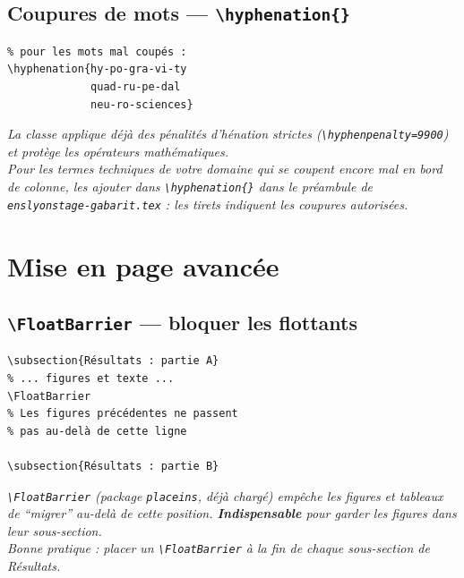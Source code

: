 \documentclass[12pt, a4paper]{article}
\begin{document}
\subsection{Coupures de mots — \texttt{\textbackslash hyphenation\{\}}}

\begin{demo}
\begin{lstlisting}[style=latexcode]
% Dans le préambule de enslyonstage-gabarit.tex,
% pour les mots mal coupés :
\hyphenation{hy-po-gra-vi-ty
             quad-ru-pe-dal
             neu-ro-sciences}
\end{lstlisting}
\tcblower
{\footnotesize\itshape La classe applique déjà des pénalités d'hénation strictes (\texttt{\textbackslash hyphenpenalty=9900}) et protège les opérateurs mathématiques.\\[6pt]
Pour les termes techniques de votre domaine qui se coupent encore mal en bord de colonne, les ajouter dans \texttt{\textbackslash hyphenation\{\}} dans le préambule de \texttt{enslyonstage-gabarit.tex} : les tirets indiquent les coupures autorisées.}
\end{demo}

\section{Mise en page avancée}
\label{sec:misc}

\subsection{\texttt{\textbackslash FloatBarrier} — bloquer les flottants}

\begin{demo}
\begin{lstlisting}[style=latexcode]
\subsection{Résultats : partie A}
% ... figures et texte ...
\FloatBarrier
% Les figures précédentes ne passent
% pas au-delà de cette ligne

\subsection{Résultats : partie B}
\end{lstlisting}
\tcblower
{\footnotesize\itshape \texttt{\textbackslash FloatBarrier} (package \texttt{placeins}, déjà chargé) empêche les figures et tableaux de ``migrer'' au-delà de cette position. \textbf{Indispensable} pour garder les figures dans leur sous-section.\\[6pt]
Bonne pratique : placer un \texttt{\textbackslash FloatBarrier} à la fin de chaque sous-section de Résultats.}
\end{demo}
\end{document}
